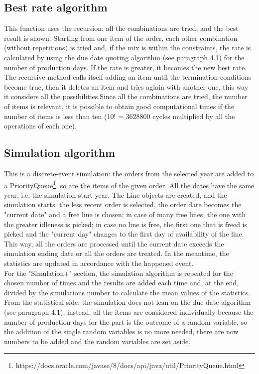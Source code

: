 \documentclass[a4paper,12pt]{article}
\begin{document}
\subsection{Best rate algorithm}
This function uses the recursion: all the combinations are tried, and the best result is shown. Starting from one item of the order, each other combination (without repetitions) is tried and, if the mix is within the constraints, the rate is calculated by using the due date quoting algorithm (see paragraph 4.1) for the number of production days. If the rate is greater, it becomes the new best rate. The recursive method calls itself adding an item until the termination conditions become true, then it deletes an item and tries agiain with another one, this way it considers all the possibilities.Since all the combinations are tried, the number of items is relevant, it is possible to obtain good computational times if the number of items is less than ten (10! =  3628800 cycles multiplied by all the operations of each one). \\

\subsection{Simulation algorithm}
 This is a discrete-event simulation: the orders from the selected year are added to a PriorityQueue\footnote{https://docs.oracle.com/javase/8/docs/api/java/util/PriorityQueue.html}, so are the items of the given order. All the dates have the same year, i.e. the simulation start year. The Line objects are created, and the simulation starts: the less recent order is selected, the order date becomes the "current date" and a free line is chosen; in case of many free lines, the one with the greater idleness is picked; in case no line is free, the first one that is freed is picked and the "current day" changes to the first day of availability of the line. This way, all the orders are processed until the current date exceeds the simulation ending date or all the orders are treated. In the meantime, the statistics are updated in accordance with the happened event. \\
For the "Simulation+" section, the simulation algorithm is repeated for the chosen number of times and the results are added each time and, at the end, divided by the simulations number to calculate the mean values of the statistics.\\
From the statistical side, the simulation does not lean on the due date algorithm (see paragraph 4.1), instead, all the items are considered individually because the number of production days for the part  is the outcome of a random variable, so the addition of the single random variables is no more needed, there are now numbers to be added and the random variables are set aside.
\end{document}
